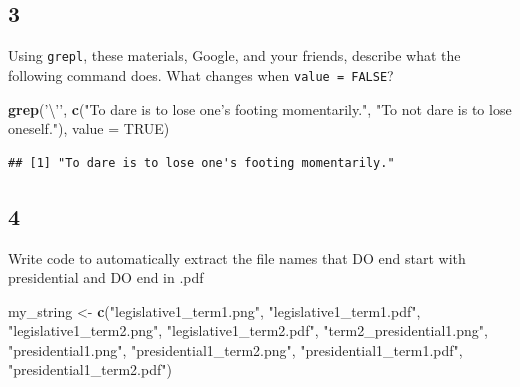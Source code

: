 \documentclass[]{book}
\newenvironment{Shaded}{\begin{snugshade}}{\end{snugshade}}
\newcommand{\CharTok}[1]{\textcolor[rgb]{0.31,0.60,0.02}{#1}}
\newcommand{\DataTypeTok}[1]{\textcolor[rgb]{0.13,0.29,0.53}{#1}}
\newcommand{\KeywordTok}[1]{\textcolor[rgb]{0.13,0.29,0.53}{\textbf{#1}}}
\newcommand{\NormalTok}[1]{#1}
\newcommand{\OtherTok}[1]{\textcolor[rgb]{0.56,0.35,0.01}{#1}}
\newcommand{\StringTok}[1]{\textcolor[rgb]{0.31,0.60,0.02}{#1}}
\theoremstyle{definition}
\theoremstyle{definition}
\theoremstyle{definition}
\theoremstyle{remark}
\begin{document}
\begin{Shaded}
\begin{Highlighting}[]
\begin{Shaded}
\begin{Highlighting}[]
\begin{Shaded}
\begin{Highlighting}[]
\hypertarget{section-19}{%
\subsection*{3}\label{section-19}}

Using \texttt{grepl}, these materials, Google, and your friends, describe what the following command does. What changes when \texttt{value\ =\ FALSE}?

\begin{Shaded}
\begin{Highlighting}[]
\KeywordTok{grep}\NormalTok{(}\StringTok{'}\CharTok{\textbackslash{}'}\StringTok{'}\NormalTok{, }
     \KeywordTok{c}\NormalTok{(}\StringTok{"To dare is to lose one's footing momentarily."}\NormalTok{,  }\StringTok{"To not dare is to lose oneself."}\NormalTok{), }\DataTypeTok{value =} \OtherTok{TRUE}\NormalTok{)}
\end{Highlighting}
\end{Shaded}

\begin{verbatim}
## [1] "To dare is to lose one's footing momentarily."
\end{verbatim}

\hypertarget{section-20}{%
\subsection*{4}\label{section-20}}

Write code to automatically extract the file names that DO end start with presidential and DO end in .pdf

\begin{Shaded}
\begin{Highlighting}[]
\NormalTok{my_string <-}\StringTok{ }\KeywordTok{c}\NormalTok{(}\StringTok{"legislative1_term1.png"}\NormalTok{, }
               \StringTok{"legislative1_term1.pdf"}\NormalTok{,}
               \StringTok{"legislative1_term2.png"}\NormalTok{, }
               \StringTok{"legislative1_term2.pdf"}\NormalTok{,}
               \StringTok{"term2_presidential1.png"}\NormalTok{, }
               \StringTok{"presidential1.png"}\NormalTok{, }
               \StringTok{"presidential1_term2.png"}\NormalTok{,}
               \StringTok{"presidential1_term1.pdf"}\NormalTok{,}
               \StringTok{"presidential1_term2.pdf"}\NormalTok{)}
\end{Highlighting}
\end{Shaded}


\end{Highlighting}
\end{Shaded}
\end{Highlighting}
\end{Shaded}
\end{Highlighting}
\end{Shaded}
\end{document}
